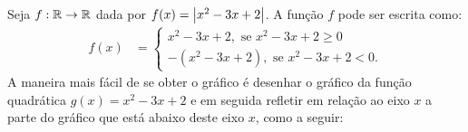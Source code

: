 \begin{exem}
  Seja $f: \mathbb{R} \rightarrow \mathbb{R}$ dada por $f(x)= \left|x^2-3x+2\right|$.
  A função $f$ pode ser escrita como:
    \begin{align*}
        f(x)& = 
        \begin{cases}
         x^2-3x+2, \text{ se } x^2-3x+2 \geq 0 \\
         -(x^2-3x+2), \text{ se } x^2-3x+2 < 0.
        \end{cases}
    \end{align*}
  A maneira mais fácil de se obter o gráfico é desenhar o gráfico da função quadrática $g(x)=x^2-3x+2$ e em seguida refletir em relação ao eixo $x$ a parte do gráfico que está abaixo deste eixo $x$, como a seguir:
  \begin{center}
\end{center}
\end{exem}

